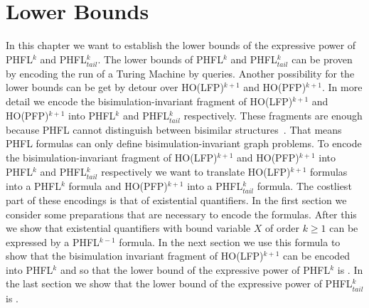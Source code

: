 
\chapter{Lower Bounds}\label{ch:lowerBounds}

In this chapter we want to establish the lower bounds of the expressive power of PHFL$^k$ and PHFL$^k_{tail}$. The
lower bounds of PHFL$^k$ and PHFL$^k_{tail}$ can be proven by encoding the run of a Turing Machine by queries.
Another possibility for the lower bounds can be get by detour over HO(LFP)$^{k+1}$ and HO(PFP)$^{k+1}$. In more detail
we encode the bisimulation-invariant fragment of HO(LFP)$^{k+1}$ and HO(PFP)$^{k+1}$ into PHFL$^k$ and
PHFL$^k_{tail}$ respectively. These fragments are enough because PHFL cannot distinguish between bisimilar structures~\cite{lange2014capturing}. That means PHFL formulas can only define bisimulation-invariant
graph problems. To encode the bisimulation-invariant fragment of HO(LF\-P)$^{k+1}$ and HO(PFP)$^{k+1}$ into PHFL$^k$ and
PHFL$^{k}_{tail}$ respectively we want to translate HO(LFP)$^{k+1}$ formulas into a PHFL$^k$ formula and 
HO(PFP)$^{k+1}$ into a PHFL$^k_{tail}$ formula. The costliest part of these encodings is that of existential quantifiers. In the 
first section we consider some preparations that are necessary to encode the formulas. After this we show that existential 
quantifiers with bound variable $X$ of order $k \geq 1$ can be expressed by a PHFL$^{k-1}$ formula. In the next section we 
use this formula to show that the bisimulation invariant fragment of HO(LFP)$^{k+1}$ can be encoded into PHFL$^k$ and so 
that the lower bound of the expressive power of PHFL$^k$ is . In the last section we show that the lower bound 
of the expressive power of PHFL$^k_{tail}$ is .








